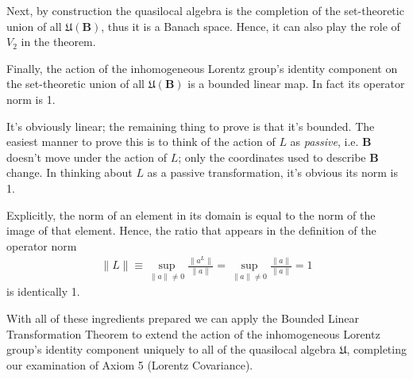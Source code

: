 Next, by construction the quasilocal algebra is the completion of the set-theoretic union of all $\mathfrak{U}(\mathbf{B})$, thus it is a Banach space. Hence, it can also play the role of $V_2$ in the theorem.

Finally, the action of the inhomogeneous Lorentz group's identity component on the set-theoretic union of all $\mathfrak{U}(\mathbf{B})$ is a bounded linear map. In fact its operator norm is 1.

It's obviously linear; the remaining thing to prove is that it's bounded. The easiest manner to prove this is to think of the action of $L$ as \textit{passive}, i.e. $\mathbf{B}$ doesn't move under the action of $L$; only the coordinates used to describe $\mathbf{B}$ change. In thinking about $L$ as a passive transformation, it's obvious its norm is 1.

Explicitly, the norm of an element in its domain is equal to the norm of the image of that element. Hence, the ratio that appears in the definition of the operator norm
\begin{align}
\|L\| \equiv \sup\limits_{\|a\| \ne 0} \frac{\|a^L\|}{\|a\|} = \sup\limits_{\|a\| \ne 0} \frac{\|a\|}{\|a\|} = 1
\end{align}
is identically 1.

With all of these ingredients prepared we can apply the Bounded Linear Transformation Theorem to extend the action of the inhomogeneous Lorentz group's identity component uniquely to all of the quasilocal algebra $\mathfrak{U}$, completing our examination of Axiom 5 (Lorentz Covariance).
